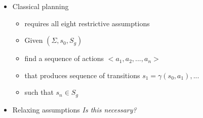 \begin{itemize}
 \item Classical planning
 \begin{itemize}
  \item requires all eight restrictive assumptions
  \item Given $(\Sigma, s_0, S_g)$
  \item find a sequence of actions $<a_1,a_2,...,a_n>$
  \item that produces sequence of transitions $s_1 = \gamma(s_0,a_1), ...$
  \item such that $s_n \in S_g$
 \end{itemize}
 
 \item Relaxing assumptions
 \emph{Is this necessary?} 
 
\end{itemize}

